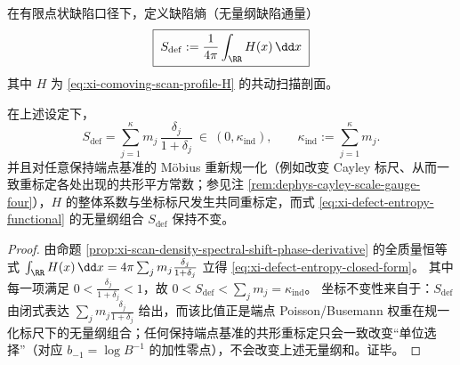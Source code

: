 \begin{definition}\label{def:xi-defect-entropy-functional}
在有限点状缺陷口径下，定义缺陷熵（无量纲缺陷通量）
\begin{equation}\label{eq:xi-defect-entropy-functional}
\boxed{\;
S_{\mathrm{def}}
:=\frac{1}{4\pi}\int_{\RR}H(x)\,\dd x\;}
\end{equation}
其中 \(H\) 为 \eqref{eq:xi-comoving-scan-profile-H} 的共动扫描剖面。
\end{definition}

\begin{proposition}[缺陷熵的闭式表达与坐标不变性]\label{prop:xi-defect-entropy-closed-form-invariant}
在上述设定下，
\begin{equation}\label{eq:xi-defect-entropy-closed-form}
\boxed{\;
S_{\mathrm{def}}
=\sum_{j=1}^{\kappa}m_j\,\frac{\delta_j}{1+\delta_j}\ \in\ (0,\kappa_{\mathrm{ind}}),\qquad
\kappa_{\mathrm{ind}}:=\sum_{j=1}^{\kappa}m_j.\;}
\end{equation}
并且对任意保持端点基准的 Möbius 重新规一化（例如改变 Cayley 标尺、从而一致重标定各处出现的共形平方常数；参见注 \ref{rem:dephys-cayley-scale-gauge-four}），\(H\) 的整体系数与坐标标尺发生共同重标定，而式 \eqref{eq:xi-defect-entropy-functional} 的无量纲组合 \(S_{\mathrm{def}}\) 保持不变。
\end{proposition}

\begin{proof}
由命题 \ref{prop:xi-scan-density-spectral-shift-phase-derivative} 的全质量恒等式
\(
\int_{\RR}H(x)\,\dd x
=4\pi\sum_{j}m_j\frac{\delta_j}{1+\delta_j}
\)
立得 \eqref{eq:xi-defect-entropy-closed-form}。
其中每一项满足 \(0<\frac{\delta_j}{1+\delta_j}<1\)，故 \(0<S_{\mathrm{def}}<\sum_j m_j=\kappa_{\mathrm{ind}}\)。
坐标不变性来自于：\(S_{\mathrm{def}}\) 由闭式表达 \(\sum_j m_j\frac{\delta_j}{1+\delta_j}\) 给出，而该比值正是端点 Poisson/Busemann 权重在规一化标尺下的无量纲组合；任何保持端点基准的共形重标定只会一致改变“单位选择”（对应 \(b_{-1}=\log B^{-1}\) 的加性零点），不会改变上述无量纲和。证毕。
\end{proof}

